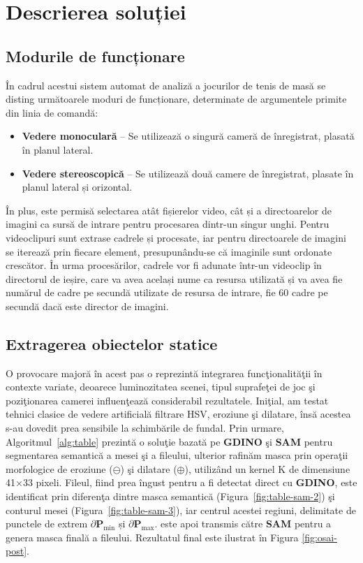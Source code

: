 \chapter{Descrierea soluției}

\section{Modurile de funcționare}

În cadrul acestui sistem automat de analiză a jocurilor de tenis de masă se disting următoarele moduri de funcționare, determinate de argumentele primite din linia de comandă:

\begin{itemize}
    \item \textbf{Vedere monoculară} – Se utilizează o singură cameră de înregistrat, plasată în planul lateral.
    \item \textbf{Vedere stereoscopică} – Se utilizează două camere de înregistrat, plasate în planul lateral și orizontal.
\end{itemize}

În plus, este permisă selectarea atât fișierelor video, cât și a directoarelor de imagini ca sursă de intrare pentru procesarea dintr-un singur unghi. Pentru videoclipuri sunt extrase cadrele și procesate, iar pentru directoarele de imagini se iterează prin fiecare element, presupunându-se că imaginile sunt ordonate crescător. În urma procesărilor, cadrele vor fi adunate într-un videoclip în directorul de ieșire, care va avea același nume ca resursa utilizată și va avea fie numărul de cadre pe secundă utilizate de resursa de intrare, fie 60 cadre pe secundă dacă este director de imagini.

\section{Extragerea obiectelor statice}
\label{subsec:static-objects}

O provocare majoră în acest pas o reprezintă integrarea funcţionalităţii în contexte variate, deoarece luminozitatea scenei, tipul suprafeţei de joc şi poziţionarea camerei influenţează considerabil rezultatele. Iniţial, am testat tehnici clasice de vedere artificială filtrare HSV, eroziune şi dilatare\cite{gonzalez1992digital}, însă acestea s-au dovedit prea sensibile la schimbările de fundal. Prin urmare, Algoritmul~\ref{alg:table} prezintă o soluţie bazată pe \textbf{GDINO} şi \textbf{SAM} pentru segmentarea semantică a mesei şi a fileului, ulterior rafinăm masca prin operaţii morfologice de eroziune (\(\ominus\)) şi dilatare (\(\oplus\)), utilizând un kernel K de dimensiune 41×33 pixeli. Fileul, fiind prea îngust pentru a fi detectat direct cu \textbf{GDINO}, este identificat prin diferenţa dintre masca semantică (Figura~\ref{fig:table-sam-2}) şi conturul mesei (Figura~\ref{fig:table-sam-3}), iar centrul acestei regiuni, delimitate de punctele de extrem $\partial \mathbf{P}_{\min}$ și $\partial\mathbf{P}_{\max}$. este apoi transmis către \textbf{SAM} pentru a genera masca finală a fileului. Rezultatul final este ilustrat în Figura \ref{fig:osai-post}.


